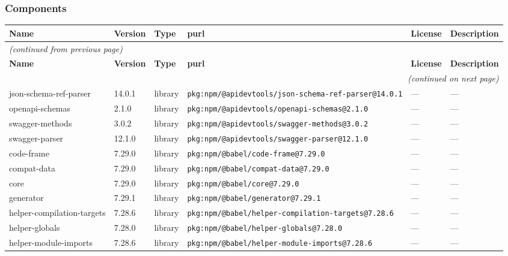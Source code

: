 \documentclass[11pt,a4paper]{article}
\begin{document}
\subsubsection*{Components}
\begin{longtable}{|p{4cm}|p{2cm}|p{1.6cm}|p{5cm}|p{1.5cm}|p{3.5cm}|}
\toprule
\rowcolor{sbomhdr}\textbf{Name} & \textbf{Version} & \textbf{Type} & \textbf{purl} & \textbf{License} & \textbf{Description} \\
\midrule
\endfirsthead
\multicolumn{6}{l}{\small\itshape (continued from previous page)} \\
\toprule
\rowcolor{sbomhdr}\textbf{Name} & \textbf{Version} & \textbf{Type} & \textbf{purl} & \textbf{License} & \textbf{Description} \\
\midrule
\endhead
\midrule
\multicolumn{6}{r}{\small\itshape (continued on next page)} \\
\endfoot
\bottomrule
\endlastfoot
\raggedright json-schema-ref-parser & 14.0.1 & library & \small\texttt{pkg:npm/@apidevtools/json-schema-ref-parser@14.0.1} & — & \small — \\
\raggedright openapi-schemas & 2.1.0 & library & \small\texttt{pkg:npm/@apidevtools/openapi-schemas@2.1.0} & — & \small — \\
\raggedright swagger-methods & 3.0.2 & library & \small\texttt{pkg:npm/@apidevtools/swagger-methods@3.0.2} & — & \small — \\
\raggedright swagger-parser & 12.1.0 & library & \small\texttt{pkg:npm/@apidevtools/swagger-parser@12.1.0} & — & \small — \\
\raggedright code-frame & 7.29.0 & library & \small\texttt{pkg:npm/@babel/code-frame@7.29.0} & — & \small — \\
\raggedright compat-data & 7.29.0 & library & \small\texttt{pkg:npm/@babel/compat-data@7.29.0} & — & \small — \\
\raggedright core & 7.29.0 & library & \small\texttt{pkg:npm/@babel/core@7.29.0} & — & \small — \\
\raggedright generator & 7.29.1 & library & \small\texttt{pkg:npm/@babel/generator@7.29.1} & — & \small — \\
\raggedright helper-compilation-targets & 7.28.6 & library & \small\texttt{pkg:npm/@babel/helper-compilation-targets@7.28.6} & — & \small — \\
\raggedright helper-globals & 7.28.0 & library & \small\texttt{pkg:npm/@babel/helper-globals@7.28.0} & — & \small — \\
\raggedright helper-module-imports & 7.28.6 & library & \small\texttt{pkg:npm/@babel/helper-module-imports@7.28.6} & — & \small — \\

\end{longtable}
\end{document}
